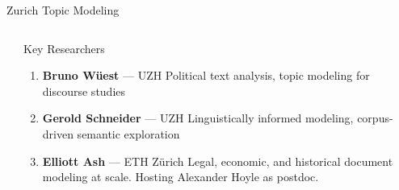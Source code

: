 \documentclass[compress]{beamer}
\begin{document}
\begin{frame}{Zurich Topic Modeling}
\begin{columns}
  \begin{column}{0.45\textwidth}
  \end{column}
  \begin{column}{0.5\textwidth}
    \begin{block}{Key Researchers}
      \begin{enumerate}
        \item \textbf{Bruno Wüest} — UZH  
        Political text analysis, topic modeling for discourse studies

        \item \textbf{Gerold Schneider} — UZH  
        Linguistically informed modeling, corpus-driven semantic exploration

        \item \textbf{Elliott Ash} — ETH Zürich  
        Legal, economic, and historical document modeling at scale.  Hosting Alexander Hoyle as postdoc.
      \end{enumerate}
    \end{block}
  \end{column}
\end{columns}
\end{frame}
\end{document}
